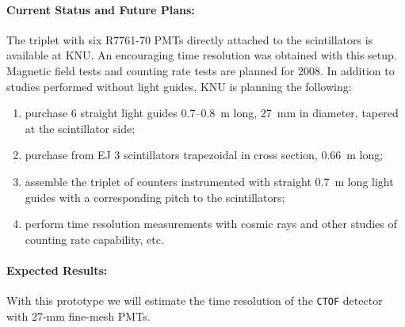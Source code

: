 \documentclass[12pt]{article}
\begin{document}
\paragraph{Current Status and Future Plans:}
The triplet with six R7761-70 PMTs directly attached to the scintillators 
is available at KNU.  An encouraging time resolution was obtained with this 
setup.  Magnetic field tests and counting rate tests are planned for 2008.
In addition to studies performed without light guides, KNU is planning the 
following:

\begin{enumerate}
 \item purchase 6 straight light guides 0.7--0.8~m long, 27~mm in diameter, 
tapered at the scintillator side;
 \item purchase from EJ 3 scintillators trapezoidal in cross section, 0.66~m 
long;
 \item assemble the triplet of counters instrumented with straight 0.7~m 
long light guides with a corresponding pitch to the scintillators;
 \item perform time resolution measurements with cosmic rays and other 
studies of counting rate capability, etc.
\end{enumerate}

\paragraph{Expected Results:} 
With this prototype we will estimate the time resolution of the {\tt CTOF} 
detector with 27-mm fine-mesh PMTs.
\end{document}
